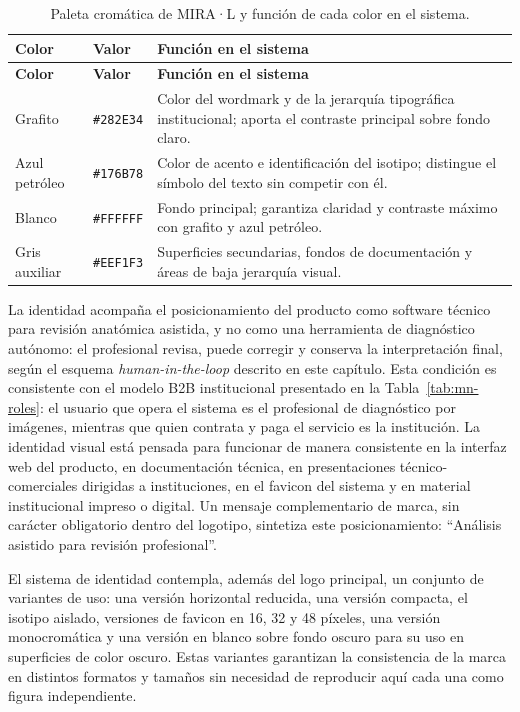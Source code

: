 {\scriptsize
\setlength{\LTleft}{0pt}
\setlength{\LTright}{0pt}
\setlength{\tabcolsep}{3pt}
\renewcommand{\arraystretch}{1.18}
\begin{longtable}{>{\raggedright\arraybackslash}p{} >{\raggedright\arraybackslash}p{} >{\raggedright\arraybackslash}p{}}
\caption{Paleta cromática de MIRA·L y función de cada color en el sistema.}\label{tab:mn-branding-paleta}\\
\hline
\textbf{Color} & \textbf{Valor} & \textbf{Función en el sistema} \\
\hline
\endfirsthead
\hline
\textbf{Color} & \textbf{Valor} & \textbf{Función en el sistema} \\
\hline
\endhead
\hline
\endfoot
Grafito & \texttt{\#282E34} & Color del wordmark y de la jerarquía tipográfica institucional; aporta el contraste principal sobre fondo claro. \\
Azul petróleo & \texttt{\#176B78} & Color de acento e identificación del isotipo; distingue el símbolo del texto sin competir con él. \\
Blanco & \texttt{\#FFFFFF} & Fondo principal; garantiza claridad y contraste máximo con grafito y azul petróleo. \\
Gris auxiliar & \texttt{\#EEF1F3} & Superficies secundarias, fondos de documentación y áreas de baja jerarquía visual. \\
\hline
\end{longtable}
}

La identidad acompaña el posicionamiento del producto como software técnico para revisión anatómica asistida, y no como una herramienta de diagnóstico autónomo: el profesional revisa, puede corregir y conserva la interpretación final, según el esquema \textit{human-in-the-loop} descrito en este capítulo. Esta condición es consistente con el modelo B2B institucional presentado en la Tabla~\ref{tab:mn-roles}: el usuario que opera el sistema es el profesional de diagnóstico por imágenes, mientras que quien contrata y paga el servicio es la institución. La identidad visual está pensada para funcionar de manera consistente en la interfaz web del producto, en documentación técnica, en presentaciones técnico-comerciales dirigidas a instituciones, en el favicon del sistema y en material institucional impreso o digital. Un mensaje complementario de marca, sin carácter obligatorio dentro del logotipo, sintetiza este posicionamiento: \enquote{Análisis asistido para revisión profesional}.

El sistema de identidad contempla, además del logo principal, un conjunto de variantes de uso: una versión horizontal reducida, una versión compacta, el isotipo aislado, versiones de favicon en 16, 32 y 48 píxeles, una versión monocromática y una versión en blanco sobre fondo oscuro para su uso en superficies de color oscuro. Estas variantes garantizan la consistencia de la marca en distintos formatos y tamaños sin necesidad de reproducir aquí cada una como figura independiente.

